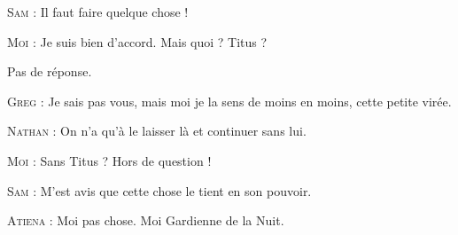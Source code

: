 \begin{dialogue}

\textsc{Sam} : Il faut faire quelque chose !

\textsc{Moi} : Je suis bien d’accord. Mais quoi ? Titus ?

Pas de réponse.

\textsc{Greg} : Je sais pas vous, mais moi je la sens de moins en moins, cette petite virée.

\textsc{Nathan} : On n’a qu’à le laisser là et continuer sans lui.

\textsc{Moi} : Sans Titus ? Hors de question !

\textsc{Sam} : M’est avis que cette chose le tient en son pouvoir.

\textsc{Atiena} : Moi pas chose. Moi Gardienne de la Nuit.

\end{dialogue}

